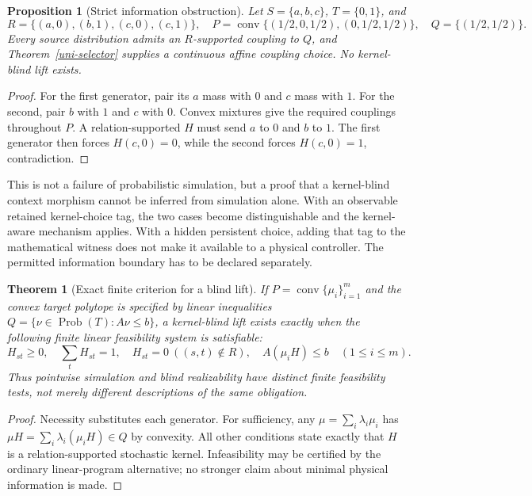 \documentclass[11pt]{article}
\newtheorem{theorem}{Theorem}\newtheorem{proposition}{Proposition}\newtheorem{corollary}{Corollary}\newtheorem{definition}{Definition}
\begin{document}
\begin{proposition}[Strict information obstruction]\label{uni-blind}
Let $S=\{a,b,c\}$, $T=\{0,1\}$, and
\[
 R=\{(a,0),(b,1),(c,0),(c,1)\},\quad
 P=\operatorname{conv}\{(1/2,0,1/2),(0,1/2,1/2)\},\quad
 Q=\{(1/2,1/2)\}.
\]
Every source distribution admits an $R$-supported coupling to $Q$, and Theorem~\ref{uni-selector} supplies a continuous affine coupling choice. No kernel-blind lift exists.
\end{proposition}
\begin{proof}
For the first generator, pair its $a$ mass with $0$ and $c$ mass with $1$. For the second, pair $b$ with $1$ and $c$ with $0$. Convex mixtures give the required couplings throughout $P$. A relation-supported $H$ must send $a$ to $0$ and $b$ to $1$. The first generator then forces $H(c,0)=0$, while the second forces $H(c,0)=1$, contradiction.
\end{proof}

This is not a failure of probabilistic simulation, but a proof that a kernel-blind context morphism cannot be inferred from simulation alone. With an observable retained kernel-choice tag, the two cases become distinguishable and the kernel-aware mechanism applies. With a hidden persistent choice, adding that tag to the mathematical witness does not make it available to a physical controller. The permitted information boundary has to be declared separately.

\begin{theorem}[Exact finite criterion for a blind lift]
If $P=\operatorname{conv}\{\mu_i\}_{i=1}^m$ and the convex target polytope is specified by linear inequalities $Q=\{\nu\in\operatorname{Prob}(T):A\nu\le b\}$, a kernel-blind lift exists exactly when the following finite linear feasibility system is satisfiable:
\[
 H_{st}\ge0,\quad \sum_tH_{st}=1,\quad H_{st}=0\ ((s,t)\notin R),\quad A(\mu_iH)\le b\quad(1\le i\le m).
\]
Thus pointwise simulation and blind realizability have distinct finite feasibility tests, not merely different descriptions of the same obligation.
\end{theorem}
\begin{proof}
Necessity substitutes each generator. For sufficiency, any $\mu=\sum_i\lambda_i\mu_i$ has $\mu H=\sum_i\lambda_i(\mu_iH)\in Q$ by convexity. All other conditions state exactly that $H$ is a relation-supported stochastic kernel. Infeasibility may be certified by the ordinary linear-program alternative; no stronger claim about minimal physical information is made.
\end{proof}
\end{document}
